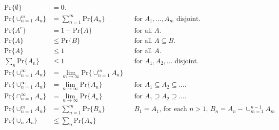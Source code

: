 \documentclass[UTF8]{article}
\begin{document}
    \setcounter{equation}{1}
    \begin{align}
        \label{eq:2}
        \text{Pr}\{\emptyset\} &= 0.\\
        \label{eq:3}
        \text{Pr}\big\{\cup^m_{n=1}A_n\big\}&=\sum^{m}_{n=1}\text{Pr}\{A_n\} && \text{for $A_1,\dots,A_m$ disjoint.}\\
        \label{eq:4}
        \text{Pr}\{A^c\}&=1-\text{Pr}\{A\}& &\text{for all $A$.}\\
        \label{eq:5}
        \text{Pr}\{A\}&\leq\text{Pr}\{B\}&&\text{for all $A\subseteq B$.}\\
        \label{eq:6}
        \text{Pr}\{A\}&\leq 1 && \text{for all $A$.}\\
        \label{eq:7}
        \sum_n\text{Pr}\{A_n\}&\leq1&&\text{for $A_1,A_2,\dots$ disjoint.}\\
        \label{eq:8}
        \text{Pr}\big\{\cup^\infty_{n=1}A_n\big\}&=\lim_{m\rightarrow\infty}\text{Pr}\{\cup^m_{n=1}A_n\}\\
        \label{eq:9}
        \text{Pr}\big\{\cup^\infty_{n=1}A_n\big\}&=\lim_{n\rightarrow\infty}\text{Pr}\{A_n\}&&\text{for $A_1\subseteq A_2\subseteq\dots$.}\\
        \label{eq:10}
        \text{Pr}\big\{\cap^\infty_{n=1}A_n\big\}&=\lim_{n\rightarrow\infty}\text{Pr}\{A_n\} && \text{for $A_1\supseteq A_2\supseteq\dots$.}\\
        \label{eq:11}
        \text{Pr}\{\cup^m_{n=1}A_n\}&=\sum^m_{n=1}\text{Pr}\{B_n\}&&\text{$B_1=A_1$, for each $n>1$, $B_n=A_n-\cup^{n-1}_{m=1}A_m$}\\
        \label{eq:12}
        \text{Pr}\{\cup_nA_n\}&\leq\sum_n\text{Pr}\{A_n\}
    \end{align}
\end{document}
